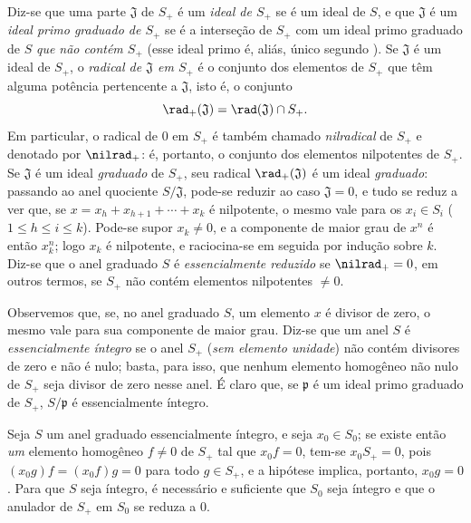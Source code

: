 \documentclass[oneside,10pt]{amsart}
\renewcommand{\leq}{\leqslant}
\let\EGAOriginalLabel\label
\renewcommand{\label}[1]{\phantomsection\EGAOriginalLabel{#1}}
\begin{document}
\begin{env}[2.1.10]
\label{II.2.1.10}
Diz-se que uma parte $\mathfrak{J}$ de $S_+$ é um \emph{ideal de $S_+$} se é um ideal de $S$, e que $\mathfrak{J}$ é um \emph{ideal primo graduado de $S_+$} se é a interseção de $S_+$ com um ideal primo graduado de $S$ \emph{que não contém $S_+$} (esse ideal primo é, aliás, único segundo ).
Se $\mathfrak{J}$ é um ideal de $S_+$, o \emph{radical de $\mathfrak{J}$ em $S_+$} é o conjunto dos elementos de $S_+$ que têm alguma potência pertencente a $\mathfrak{J}$, isto é, o conjunto
\[
  \rad_+(\mathfrak{J})=\rad(\mathfrak{J})\cap S_+.
\]
Em particular, o radical de $0$ em $S_+$ é também chamado \emph{nilradical} de $S_+$ e denotado por $\nilrad_+$: é, portanto, o conjunto dos elementos nilpotentes de $S_+$.
Se $\mathfrak{J}$ é um ideal \emph{graduado} de $S_+$, seu radical $\rad_+(\mathfrak{J})$ é um ideal \emph{graduado}: passando ao anel quociente $S/\mathfrak{J}$, pode-se reduzir ao caso $\mathfrak{J}=0$, e tudo se reduz a ver que, se $x=x_h+x_{h+1}+\cdots+x_k$ é nilpotente, o mesmo vale para os $x_i\in S_i$ ($1\leq h\leq i\leq k$).
Pode-se supor $x_k\neq0$, e a componente de maior grau de $x^n$ é então $x_k^n$; logo $x_k$ é nilpotente, e raciocina-se em seguida por indução sobre $k$.
Diz-se que o anel graduado $S$ é \emph{essencialmente reduzido} se $\nilrad_+=0$, em outros termos, se $S_+$ não contém elementos nilpotentes $\neq0$.
\end{env}

\begin{env}[2.1.11]
\label{II.2.1.11}
Observemos que, se, no anel graduado $S$, um elemento $x$ é divisor de zero, o mesmo vale para sua componente de maior grau.
Diz-se que um anel $S$ é \emph{essencialmente íntegro} se o anel $S_+$ (\emph{sem elemento unidade}) não contém divisores de zero e não é nulo; basta, para isso, que nenhum elemento homogêneo não nulo de $S_+$ seja divisor de zero nesse anel.
É claro que, se $\mathfrak{p}$ é um ideal primo graduado de $S_+$, $S/\mathfrak{p}$ é essencialmente íntegro.

Seja $S$ um anel graduado essencialmente íntegro, e seja $x_0\in S_0$; se existe então \emph{um} elemento homogêneo $f\neq0$ de $S_+$ tal que $x_0f=0$, tem-se $x_0S_+=0$, pois $(x_0g)f=(x_0f)g=0$ para todo $g\in S_+$, e a hipótese implica, portanto, $x_0g=0$.
Para que $S$ seja íntegro, é necessário e suficiente que $S_0$ seja íntegro e que o anulador de $S_+$ em $S_0$ se reduza a $0$.
\end{env}
\end{document}
